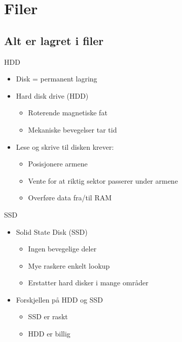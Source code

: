 \section{Filer}
\subsection*{Alt er lagret i filer}
\begin{frame}{HDD}
    \begin{itemize}[<+->]
        \item Disk = permanent lagring
        \item Hard disk drive (HDD)
        \begin{itemize}
          \item Roterende magnetiske fat 
          \item Mekaniske bevegelser tar tid
        \end{itemize}
        \item Lese og skrive til disken krever:
        \begin{itemize}
          \item Posisjonere armene
          \item Vente for at riktig sektor passerer under armene
          \item Overføre data fra/til RAM
        \end{itemize}
    \end{itemize}
\end{frame}

\begin{frame}{SSD}
  \begin{itemize}[<+->]
    \item Solid State Disk (SSD)
    \begin{itemize}
      \item Ingen bevegelige deler
      \item Mye raskere enkelt lookup
      \item Erstatter hard disker i mange områder
    \end{itemize}
    \item Forskjellen på HDD og SSD
    \begin{itemize}
      \item SSD er raskt
      \item HDD er billig
    \end{itemize}
\end{itemize}
\end{frame}



